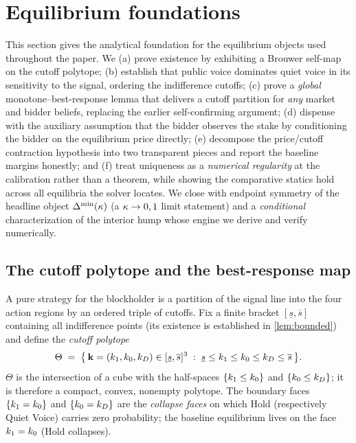 \section{Equilibrium foundations}
\label{sec:eqm-foundations}

This section gives the analytical foundation for the equilibrium objects used
throughout the paper. We (a) prove existence by exhibiting a Brouwer self-map on
the cutoff polytope; (b) establish that public voice dominates quiet voice in its
sensitivity to the signal, ordering the indifference cutoffs; (c) prove a
\emph{global} monotone--best-response lemma that delivers a cutoff partition for
\emph{any} market and bidder beliefs, replacing the earlier self-confirming
argument; (d) dispense with the auxiliary assumption that the bidder observes the
stake by conditioning the bidder on the equilibrium price directly; (e) decompose
the price/cutoff contraction hypothesis into two transparent pieces and report
the baseline margins honestly; and (f) treat uniqueness as a \emph{numerical
regularity} at the calibration rather than a theorem, while showing the
comparative statics hold across all equilibria the solver locates. We close with
endpoint symmetry of the headline object $\Delta^{\min}(\kappa)$ (a $\kappa\to0,1$ limit
statement) and a \emph{conditional} characterization of the interior hump whose
engine we derive and verify numerically.

\subsection{The cutoff polytope and the best-response map}

A pure strategy for the blockholder is a partition of the signal line into the
four action regions by an ordered triple of cutoffs. Fix a finite bracket
$[\underline{s},\overline{s}]$ containing all indifference points (its existence
is established in \ref{lem:bounded}) and define the \emph{cutoff polytope}
\begin{equation}
\label{eq:theta}
\Theta \;=\; \bigl\{\, \mathbf{k}=(k_1,k_0,k_D)\in[\underline{s},\overline{s}]^3
\;:\; \underline{s}\le k_1 \le k_0 \le k_D \le \overline{s}\,\bigr\}.
\end{equation}
$\Theta$ is the intersection of a cube with the half-spaces
$\{k_1\le k_0\}$ and $\{k_0\le k_D\}$; it is therefore a compact, convex,
nonempty polytope. The boundary faces $\{k_1=k_0\}$ and $\{k_0=k_D\}$ are
the \emph{collapse faces} on which Hold (respectively Quiet Voice) carries zero
probability; the baseline equilibrium lives on the face $k_1=k_0$ (Hold
collapses).

